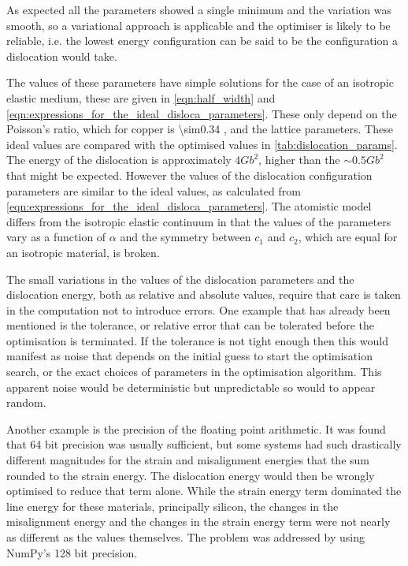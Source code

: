 As expected all the parameters showed a single minimum and the variation was smooth, so a variational approach is applicable and the optimiser is likely to be reliable, i.e. the lowest energy configuration can be said to be the configuration a dislocation would take. 






The values of these parameters have simple solutions for the case of an isotropic elastic medium, these are given in \autoref{eqn:half_width} and \autoref{eqn:expressions_for_the_ideal_disloca_parameters}. These only depend on the Poisson's ratio, which for copper is \num{\sim0.34} \cite{Koster1961}, and the lattice parameters. These ideal values are compared with the optimised values in \autoref{tab:dislocation_params}. The energy of the dislocation is approximately $4Gb^2$, higher than the $\sim0.5 G b^2$ that might be expected. However the values of the dislocation configuration parameters are similar to the ideal values, as calculated from \autoref{eqn:expressions_for_the_ideal_disloca_parameters}. The atomistic model differs from the isotropic elastic continuum in that the values of the parameters vary as a function of $\alpha$ and the symmetry between $c_1$ and $c_2$, which are equal for an isotropic material, is broken.

The small variations in the values of the dislocation parameters and the dislocation energy, both as relative and absolute values, require that care is taken in the computation not to introduce errors. One example that has already been mentioned is the tolerance, or relative error that can be tolerated before the optimisation is terminated. If the tolerance is not tight enough then this would manifest as noise that depends on the initial guess to start the optimisation search, or the exact choices of parameters in the optimisation algorithm. This apparent noise would be deterministic but unpredictable so would to appear random. 

Another example is the precision of the floating point arithmetic. It was found that \num{64} bit precision was usually sufficient, but some systems had such drastically different magnitudes for the strain and misalignment energies that the sum rounded to the strain energy. The dislocation energy would then be wrongly optimised to reduce that term alone. While the strain energy term dominated the line energy for these materials, principally silicon, the changes in the misalignment energy and the changes in the strain energy term were not nearly as different as the values themselves. The problem was addressed by using NumPy's \num{128} bit precision.  





